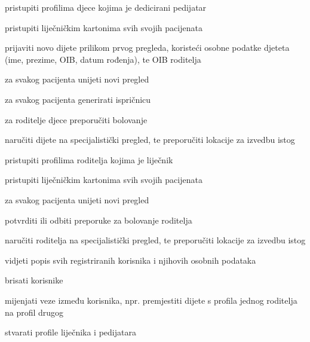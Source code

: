 \begin{packed_enum}
\begin{packed_enum}
					\item pristupiti profilima djece kojima je dedicirani pedijatar
					\item pristupiti liječničkim kartonima svih svojih pacijenata
					\item prijaviti novo dijete prilikom prvog pregleda, koristeći osobne podatke djeteta (ime, prezime, OIB, datum rođenja), te OIB roditelja
					\item za svakog pacijenta unijeti novi pregled
					\item za svakog pacijenta generirati ispričnicu
					\item za roditelje djece preporučiti bolovanje
					\item naručiti dijete na specijalistički pregled, te preporučiti lokacije za izvedbu istog
					
				\end{packed_enum}
				
				\item  {}
				
				\begin{packed_enum}
					
					\item pristupiti profilima roditelja kojima je liječnik
					\item pristupiti liječničkim kartonima svih svojih pacijenata
					\item za svakog pacijenta unijeti novi pregled
					\item potvrditi ili odbiti preporuke za bolovanje roditelja
					\item naručiti roditelja na specijalistički pregled, te preporučiti lokacije za izvedbu istog
					
				\end{packed_enum}
				
				\item  {}
				
				\begin{packed_enum}
					
					\item vidjeti popis svih registriranih korisnika i njihovih osobnih podataka
					\item brisati korisnike
					\item mijenjati veze između korisnika, npr. premjestiti dijete s profila jednog roditelja na profil drugog
					\item stvarati profile liječnika i pedijatara
					

\end{packed_enum}
\end{packed_enum}
